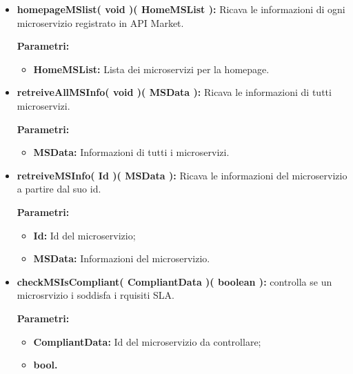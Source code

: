 \begin{itemize}
\begin{itemize}
			\item \textbf{homepageMSlist( void )( HomeMSList ):} Ricava le informazioni di ogni microservizio registrato in API Market.
				\begin{description}
    				\item[\textbf{Parametri:}]
				\end{description}
				\begin{itemize}
					\item \textbf{HomeMSList:} Lista dei microservizi per la homepage.
				\end{itemize}
			
			\item \textbf{retreiveAllMSInfo( void )( MSData ):} Ricava le informazioni di tutti microservizi.
				\begin{description}
					\item[\textbf{Parametri:}]
				\end{description}
				\begin{itemize}
					\item \textbf{MSData:} Informazioni di tutti i  microservizi.
				\end{itemize}
				
			\item \textbf{retreiveMSInfo( Id )( MSData ):} Ricava le informazioni del microservizio a partire dal suo id.
				\begin{description}
    				\item[\textbf{Parametri:}]
				\end{description}
				\begin{itemize}
					\item \textbf{Id:} Id del microservizio;
					\item \textbf{MSData:} Informazioni del microservizio.
				\end{itemize}
				
			\item \textbf{checkMSIsCompliant( CompliantData )( boolean ):} controlla se un microsrvizio i soddisfa i rquisiti SLA. 
				\begin{description}
    				\item[\textbf{Parametri:}]
				\end{description}
				\begin{itemize}
					\item \textbf{CompliantData:} Id del microservizio da controllare;
					\item \textbf{bool.}
				\end{itemize}
			

\end{itemize}
\end{itemize}
